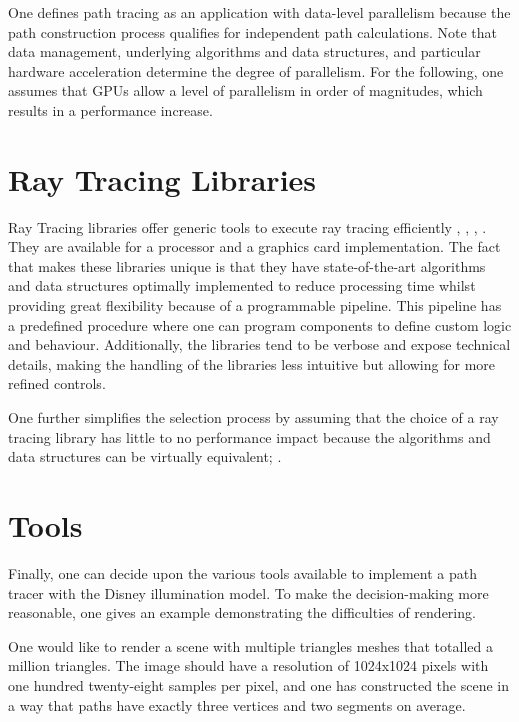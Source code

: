 One defines path tracing as an application with data-level parallelism because the path construction process qualifies for independent path calculations.
Note that data management, underlying algorithms and data structures, and particular hardware acceleration determine the degree of parallelism.
For the following, one assumes that GPUs allow a level of parallelism in order of magnitudes, which results in a performance increase.

\section{Ray Tracing Libraries}

Ray Tracing libraries offer generic tools to execute ray tracing efficiently \cite{nvidia_nvidia_2022}, \cite{intel_embree_2022}, \cite{khronos_vulkan_2022}, \cite{microsoft_directx-spec_2022}.
They are available for a processor and a graphics card implementation.
The fact that makes these libraries unique is that they have state-of-the-art algorithms and data structures optimally implemented to reduce processing time whilst providing great flexibility because of a  programmable pipeline.
This pipeline has a predefined procedure where one can program components to define custom logic and behaviour.
Additionally, the libraries tend to be verbose and expose technical details, making the handling of the libraries less intuitive but allowing for more refined controls.

One further simplifies the selection process by assuming that the choice of a ray tracing library has little to no performance impact because the algorithms and data structures can be virtually equivalent; \cite{bico_optix_2016}.

\section{Tools}

Finally, one can decide upon the various tools available to implement a path tracer with the Disney illumination model.
To make the decision-making more reasonable, one gives an example demonstrating the difficulties of rendering.

One would like to render a scene with multiple triangles meshes that totalled a million triangles.
The image should have a resolution of 1024x1024 pixels with one hundred twenty-eight samples per pixel, and one has constructed the scene in a way that paths have exactly three vertices and two segments on average.

